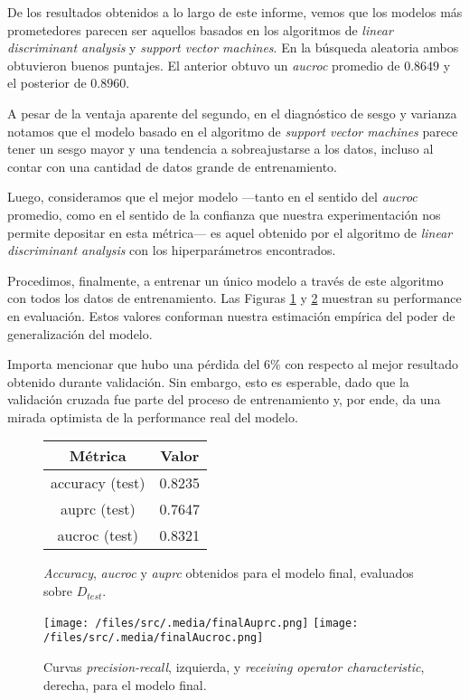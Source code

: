 De los resultados obtenidos a lo largo de este informe, vemos que los modelos más prometedores parecen ser aquellos basados en los algoritmos de \textit{linear discriminant analysis} y \textit{support vector machines}. En la búsqueda aleatoria ambos obtuvieron buenos puntajes. El anterior obtuvo un \textit{aucroc} promedio de $0.8649$ y el posterior de $0.8960$.

A pesar de la ventaja aparente del segundo, en el diagnóstico de sesgo y varianza notamos que el modelo basado en el algoritmo de \textit{support vector machines} parece tener un sesgo mayor y una tendencia a sobreajustarse a los datos, incluso al contar con una cantidad de datos grande de entrenamiento.

Luego, consideramos que el mejor modelo ---tanto en el sentido del \textit{aucroc} promedio, como en el sentido de la confianza que nuestra experimentación nos permite depositar en esta métrica--- es aquel obtenido por el algoritmo de \textit{linear discriminant analysis} con los hiperparámetros encontrados.  

Procedimos, finalmente, a entrenar un único modelo a través de este algoritmo con todos los datos de entrenamiento. Las Figuras \ref{metricas_final} y \ref{curvas_final} muestran su performance en evaluación. Estos valores conforman nuestra estimación empírica del poder de generalización del modelo.

Importa mencionar que hubo una pérdida del $6\%$ con respecto al mejor resultado obtenido durante validación. Sin embargo, esto es esperable, dado que la validación cruzada fue parte del proceso de entrenamiento y, por ende, da una mirada optimista de la performance real del modelo.

\vspace{0.5em}
\begin{figure}[!htbp]
    \begin{center}
        \begin{tabular}{ |c|c| } 
         \hline
        Métrica         & Valor \\
        \hline
        accuracy (test) &  0.8235 \\
        auprc (test)    &  0.7647 \\
        aucroc (test)   &  0.8321 \\
        \hline
        \end{tabular}
    \end{center}
    \caption{\textit{Accuracy}, \textit{aucroc} y \textit{auprc} obtenidos para el modelo final, evaluados sobre $D_{test}$.} \label{metricas_final}
\end{figure}

\begin{figure}[!htbp]
    \centering 
    \texttt{[image: /files/src/.media/finalAuprc.png]}
    \texttt{[image: /files/src/.media/finalAucroc.png]}
    \caption{Curvas \textit{precision-recall}, izquierda, y \textit{receiving operator characteristic}, derecha, para el modelo final.}
    \label{curvas_final}
\end{figure}
